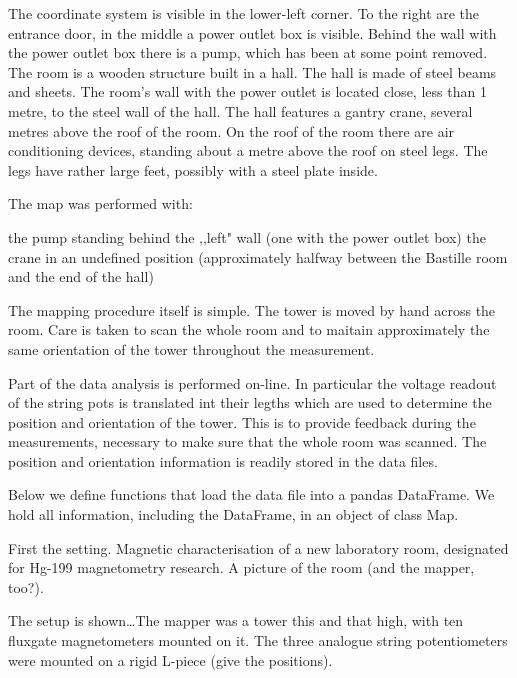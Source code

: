 The coordinate system is visible in the lower-left corner. To the right are the entrance door, in the middle a power outlet box is visible. Behind the wall with the power outlet box there is a pump, which has been at some point removed. The room is a wooden structure built in a hall. The hall is made of steel beams and sheets. The room's wall with the power outlet is located close, less than 1 metre, to the steel wall of the hall. The hall features a gantry crane, several metres above the roof of the room. On the roof of the room there are air conditioning devices, standing about a metre above the roof on steel legs. The legs have rather large feet, possibly with a steel plate inside.

The map was performed with:

    the pump standing behind the ,,left" wall (one with the power outlet box)
    the crane in an undefined position (approximately halfway between the Bastille room and the end of the hall)

The mapping procedure itself is simple. The tower is moved by hand across the room. Care is taken to scan the whole room and to maitain approximately the same orientation of the tower throughout the measurement.

Part of the data analysis is performed on-line. In particular the voltage readout of the string pots is translated int their legths which are used to determine the position and orientation of the tower. This is to provide feedback during the measurements, necessary to make sure that the whole room was scanned. The position and orientation information is readily stored in the data files.

Below we define functions that load the data file into a pandas DataFrame. We hold all information, including the DataFrame, in an object of class Map.



First the setting. Magnetic characterisation of a new laboratory room, designated for Hg-199 magnetometry research.
A picture of the room (and the mapper, too?).

The setup is shown\ldots The mapper was a tower this and that high, with ten fluxgate magnetometers mounted on it.
The three analogue string potentiometers were mounted on a rigid L-piece (give the positions).

